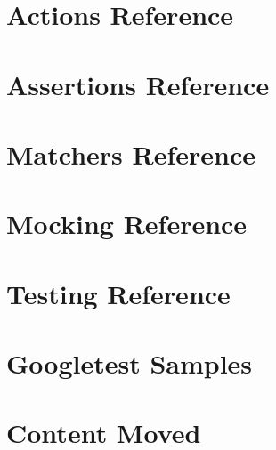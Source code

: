 \let\mypdfximage\pdfximage\def\pdfximage{\immediate\mypdfximage}\documentclass[twoside]{book}
\newcommand{\+}{\discretionary{\mbox{\scriptsize$\hookleftarrow$}}{}{}}
\begin{document}
\chapter{Actions Reference}
\label{md_build__deps_googletest_src_docs_reference_actions}

\chapter{Assertions Reference}
\label{md_build__deps_googletest_src_docs_reference_assertions}

\chapter{Matchers Reference}
\label{md_build__deps_googletest_src_docs_reference_matchers}

\chapter{Mocking Reference}
\label{md_build__deps_googletest_src_docs_reference_mocking}

\chapter{Testing Reference}
\label{md_build__deps_googletest_src_docs_reference_testing}

\chapter{Googletest Samples}
\label{md_build__deps_googletest_src_docs_samples}

\chapter{Content Moved}
\label{md_build__deps_googletest_src_googlemock_docs_README}

\end{document}
